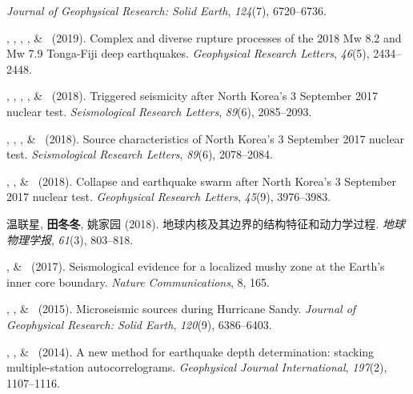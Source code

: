 \begin{etaremune}
    \emph{Journal of Geophysical Research: Solid Earth}, \emph{124}(7), 6720--6736.
\item
    \WFan\CS, \SWei, \Me, \JMcGurie, \& \DWiens\ (2019).
    Complex and diverse rupture processes of the 2018 Mw 8.2 and Mw 7.9 Tonga-Fiji deep earthquakes.
    \emph{Geophysical Research Letters}, \emph{46}(5), 2434--2448.
\item
    \JYao\CF\CS, \Me\CF, \ZLu, \LSun, \& \LWen\ (2018).
    Triggered seismicity after North Korea's 3 September 2017 nuclear test.
    \emph{Seismological Research Letters}, \emph{89}(6), 2085--2093.
\item
    \JYao\CF\CS, \Me\CF, \LSun, \& \LWen\ (2018).
    Source characteristics of North Korea's 3 September 2017 nuclear test.
    \emph{Seismological Research Letters}, \emph{89}(6), 2078--2084.
\item
    \Me\CF\CS, \JYao\CF, \& \LWen\ (2018).
    Collapse and earthquake swarm after North Korea's 3 September 2017 nuclear test.
    \emph{Geophysical Research Letters}, \emph{45}(9), 3976--3983.
\item
    温联星\CS, \textbf{田冬冬}, 姚家园 (2018).
    地球内核及其边界的结构特征和动力学过程.
    \emph{地球物理学报}, \emph{61}(3), 803--818.
\item
    \Me, \& \LWen\CS\ (2017).
    Seismological evidence for a localized mushy zone at the Earth's inner core boundary.
    \emph{Nature Communications}, 8, 165.
\item
    \XChen\CS, \Me, \& \LWen\ (2015).
    Microseismic sources during Hurricane Sandy.
    \emph{Journal of Geophysical Research: Solid Earth}, \emph{120}(9), 6386--6403.
\item \MZhang\CS, \Me, \& \LWen\ (2014).
    A new method for earthquake depth determination: stacking multiple-station autocorrelograms.
    \emph{Geophysical Journal International}, \emph{197}(2), 1107--1116.
\end{etaremune}


